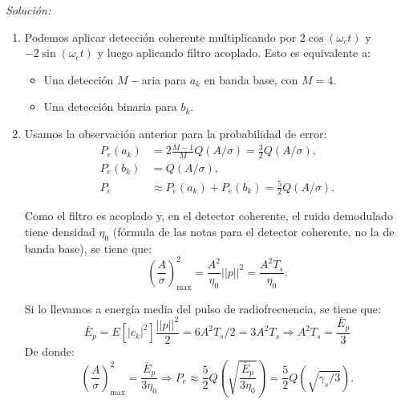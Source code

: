 \documentclass[a4paper,11pt]{article}
\newenvironment{solucion}[1][]{
\noindent \large \textsl{Solución:} \ifthenelse{\equal{#1}{}}{}{\emph{(#1)}}

\smallskip
}{
\bigskip
}
\begin{document}
\begin{solucion}
\begin{enumerate}
\begin{center}
\begin{tikzpicture}
                        \end{tikzpicture}
                \end{center}

                \item Podemos aplicar detección coherente multiplicando por $2\cos(\omega_c t)$ y $-2\sin(\omega_c t)$ y luego aplicando filtro acoplado. Esto es equivalente a:
                 \begin{itemize}
                        \item Una detección $M-$aria para $a_k$ en banda base, con $M=4$.
                        \item Una detección binaria para $b_k$.
                 \end{itemize}

                 \item Usamos la observación anterior para la probabilidad de error:
                     \begin{align*}
                        P_e(a_k) &= 2\frac{M-1}{M}Q(A/\sigma) = \frac{3}{2}Q(A/\sigma),\\
                        P_e(b_k) &= Q(A/\sigma),\\
                        P_e &\approx P_e(a_k) + P_e(b_k) = \frac{5}{2}Q(A/\sigma).
                     \end{align*}

                     Como el filtro es acoplado y, en el detector coherente, el ruido demodulado tiene densidad $\eta_0$ (fórmula de las notas para el detector coherente, no la de banda base), se tiene que:
                     \begin{equation*}
                        \left(\frac{A}{\sigma}\right)^2_{\max} = \frac{A^2}{\eta_0}||p||^2 = \frac{A^2T_s}{\eta_0}.
                     \end{equation*}

                     Si lo llevamos a energía media del pulso de radiofrecuencia, se tiene que:
                     \begin{equation*}
                        \bar{E}_p = E[|c_k|^2]\frac{||p||^2}{2} = 6 A^2 T_s/2 = 3A^2T_s \Rightarrow A^2T_s = \frac{\bar{E}_p}{3}
                     \end{equation*}
                     De donde:
                     \begin{equation*}
                        \left(\frac{A}{\sigma}\right)^2_{\max} = \frac{\bar{E}_p}{3\eta_0} \Rightarrow P_e \approx \frac{5}{2}Q\left(\sqrt{\frac{\bar{E}_p}{3\eta_0} }\right) = \frac52 Q\left(\sqrt{\gamma_s/3}\right).
                     \end{equation*}



\end{enumerate}
\end{solucion}
\end{document}
